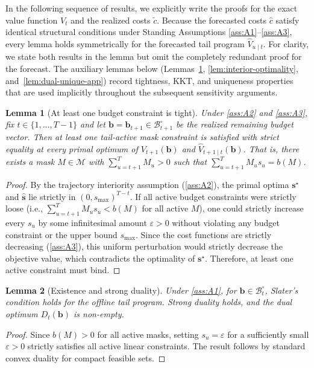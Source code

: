 \documentclass{uai2026} %
\newtheorem{lemma}{Lemma}
\newcommand{\1}{\mathbf{1}}
\renewcommand{\epsilon}{\varepsilon}
\newcommand{\mcal}{\mathcal{M}}
\newcommand{\bcal}{\mathcal{B}}
\begin{document}
In the following sequence of results, we explicitly write the proofs for the exact value function $V_t$ and the realized costs $\tilde{c}$. Because the forecasted costs $\hat{c}$ satisfy identical structural conditions under Standing Assumptions \ref{ass:A1}--\ref{ass:A3}, every lemma holds symmetrically for the forecasted tail program $\hat{V}_{u \mid t}$. For clarity, we state both results in the lemma but omit the completely redundant proof for the forecast.
The auxiliary lemmas below (Lemmas~\ref{lem:budget-tight-app}, \ref{lem:interior-optimality}, and~\ref{lem:dual-unique-app}) record tightness, KKT, and uniqueness properties that are used implicitly throughout the subsequent sensitivity arguments.

\begin{lemma}[At least one budget constraint is tight]
  \label{lem:budget-tight-app}
  Under \ref{ass:A2} and \ref{ass:A3}, fix $t \in \{1,\dots,T-1\}$ and let $\mathbf{b}=\mathbf{b}_{t+1}\in\bcal_{t+1}^{\circ}$ be the realized remaining budget vector.
  Then at least one tail-active mask constraint is satisfied with strict equality at every primal optimum of $V_{t+1}(\mathbf{b})$ and $\hat{V}_{t+1\mid t}(\mathbf{b})$.
  That is, there exists a mask $M\in\mcal$ with $\sum_{u=t+1}^{T} M_u>0$ such that $\sum_{u=t+1}^{T} M_u s_u=b(M)$.
\end{lemma}
\begin{proof}
  By the trajectory interiority assumption (\ref{ass:A2}), the primal optima $\mathbf{s}^\star$ and $\hat{\mathbf{s}}$ lie strictly in $(0, s_{\max})^{T-t}$. If all active budget constraints were strictly loose (i.e., $\sum_{u=t+1}^{T} M_u s_u < b(M)$ for all active $M$), one could strictly increase every $s_u$ by some infinitesimal amount $\varepsilon > 0$ without violating any budget constraint or the upper bound $s_{\max}$. Since the cost functions are strictly decreasing (\ref{ass:A3}), this uniform perturbation would strictly decrease the objective value, which contradicts the optimality of $\mathbf{s}^\star$. Therefore, at least one active constraint must bind.
\end{proof}

\begin{lemma}[Existence and strong duality]
  \label{lem:slater-attainment}
  Under \ref{ass:A1}, for $\mathbf{b} \in \bcal_t^\circ$, Slater's condition holds for the offline tail program. Strong duality holds, and the dual optimum $D_t(\mathbf{b})$ is non-empty.
\end{lemma}
\begin{proof}
  Since $b(M)>0$ for all active masks, setting $s_u = \epsilon$ for a sufficiently small $\epsilon>0$ strictly satisfies all active linear constraints. The result follows by standard convex duality for compact feasible sets.
\end{proof}
\end{document}
